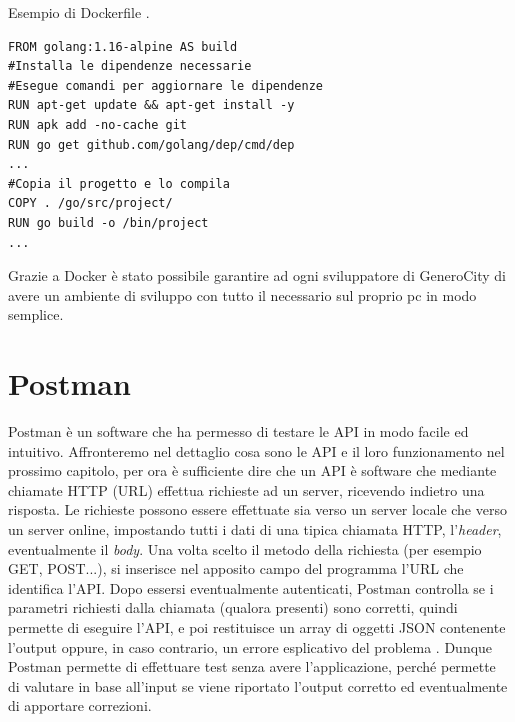 \documentclass[italian, Lau, oneside, nodefaultfont, noexaminfo]{sapthesis}
\begin{document}
\begin{listing}[H]
\caption{Esempio di Dockerfile \protect \footnotemark.}
\begin{verbatim}
FROM golang:1.16-alpine AS build
#Installa le dipendenze necessarie
#Esegue comandi per aggiornare le dipendenze
RUN apt-get update && apt-get install -y 
RUN apk add -no-cache git
RUN go get github.com/golang/dep/cmd/dep
...
#Copia il progetto e lo compila
COPY . /go/src/project/
RUN go build -o /bin/project
...
\end{verbatim}
\end{listing}


Grazie a  Docker \`e stato possibile garantire ad ogni sviluppatore di GeneroCity di avere un ambiente di sviluppo con tutto il necessario sul proprio pc in modo semplice.



\section{Postman}
\label{sec:postman}
Postman \`e un software che ha permesso di testare le API in modo facile ed intuitivo. Affronteremo nel dettaglio cosa sono le API e il loro funzionamento nel prossimo capitolo, per ora \`e sufficiente dire che un API \`e software che  mediante  chiamate HTTP (URL) effettua  richieste ad un server, ricevendo indietro una risposta.  Le richieste  possono essere effettuate sia verso un server locale che verso un server online, impostando tutti i dati di una tipica chiamata HTTP,  l'\textit{header},  eventualmente il \textit{body}.  Una volta scelto il metodo della richiesta (per esempio GET, POST...), si inserisce nel apposito campo del programma l'URL che identifica l'API. Dopo essersi eventualmente autenticati, Postman controlla  se i parametri richiesti dalla chiamata (qualora presenti)  sono corretti,  quindi permette di eseguire l'API, e poi restituisce un array di oggetti JSON contenente l'output oppure,  in caso contrario, un errore esplicativo del problema \cite{ref:postman-test}. Dunque Postman permette di effettuare test senza avere l'applicazione, perché permette di valutare in base all'input se viene riportato l'output corretto ed eventualmente di apportare correzioni.
\end{document}
